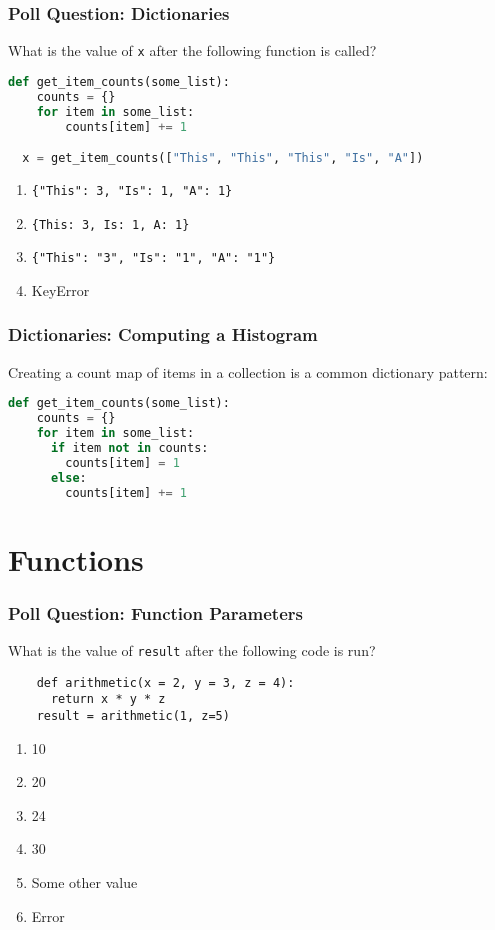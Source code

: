 \documentclass{beamer}
\begin{document}
%
%
\begin{frame}[fragile]
  \frametitle{Poll Question: Dictionaries}
  What is the value of \lstinline|x| after the following function is called?
  \begin{lstlisting}[language=Python, autogobble]
  def get_item_counts(some_list):
    counts = {}
    for item in some_list:
        counts[item] += 1

  x = get_item_counts(["This", "This", "This", "Is", "A"])
  \end{lstlisting}
  \vfill
  \begin{enumerate}
    \item \lstinline|{"This": 3, "Is": 1, "A": 1}|
    \item \lstinline|{This: 3, Is: 1, A: 1}|
    \item \lstinline|{"This": "3", "Is": "1", "A": "1"}|
    \item KeyError
  \end{enumerate}
\end{frame}

%
%
\begin{frame}[fragile]
  \frametitle{Dictionaries: Computing a Histogram}
  Creating a count map of items in a collection is a common dictionary pattern:
  \begin{lstlisting}[language=Python, autogobble]
  def get_item_counts(some_list):
    counts = {}
    for item in some_list:
      if item not in counts:
        counts[item] = 1
      else:
        counts[item] += 1
  \end{lstlisting}
\end{frame}

\section{Functions}
%
%
\begin{frame}[fragile]
  \frametitle{Poll Question: Function Parameters}
  What is the value of \lstinline|result| after the following code is run?
  \begin{lstlisting}
    def arithmetic(x = 2, y = 3, z = 4):
      return x * y * z
    result = arithmetic(1, z=5)
  \end{lstlisting}
  \vfill
  \begin{enumerate}[A]
    \item 10
    \item 20
    \item 24
    \item 30
    \item Some other value
    \item Error
  \end{enumerate}
\end{frame}
\end{document}
